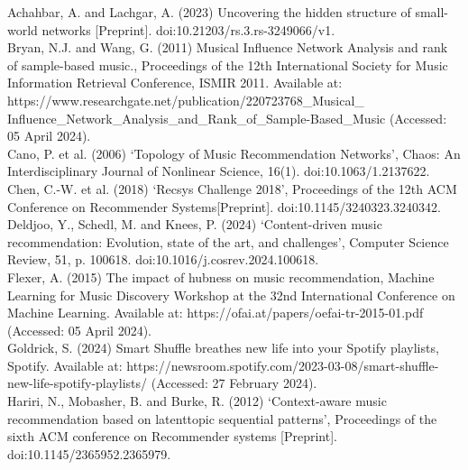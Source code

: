\documentclass[conference]{IEEEtran}
\begin{document}
\begin{thebibliography}{00}

 Achahbar, A. and Lachgar, A. (2023) Uncovering the hidden structure of small-world networks [Preprint]. doi:10.21203/rs.3.rs-3249066/v1. \\

 Bryan, N.J. and Wang, G. (2011) Musical Influence Network Analysis and rank of sample-based music., Proceedings of the 12th International Society for Music Information Retrieval Conference, ISMIR 2011. Available at: https://www.researchgate.net/publication/220723768{\_}Musical{\_}\\Influence{\_}Network{\_}Analysis{\_}and{\_}Rank{\_}of{\_}Sample-Based{\_}Music (Accessed: 05 April 2024). \\

 Cano, P. et al. (2006) ‘Topology of Music Recommendation Networks’, Chaos: An Interdisciplinary Journal of Nonlinear Science, 16(1). doi:10.1063/1.2137622. \\

 Chen, C.-W. et al. (2018) ‘Recsys Challenge 2018’, Proceedings of the 12th ACM Conference on Recommender Systems[Preprint]. doi:10.1145/3240323.3240342. \\

 Deldjoo, Y., Schedl, M. and Knees, P. (2024) ‘Content-driven music recommendation: Evolution, state of the art, and challenges’, Computer Science Review, 51, p. 100618. doi:10.1016/j.cosrev.2024.100618. \\

 Flexer, A. (2015) The impact of hubness on music recommendation, Machine Learning for Music Discovery Workshop at the 32nd International Conference on Machine Learning. Available at: https://ofai.at/papers/oefai-tr-2015-01.pdf (Accessed: 05 April 2024). \\

 Goldrick, S. (2024) Smart Shuffle breathes new life into your Spotify playlists, Spotify. Available at: https://newsroom.spotify.com/2023-03-08/smart-shuffle-new-life-spotify-playlists/ (Accessed: 27 February 2024). \\

 Hariri, N., Mobasher, B. and Burke, R. (2012) ‘Context-aware music recommendation based on latenttopic sequential patterns’, Proceedings of the sixth ACM conference on Recommender systems [Preprint]. doi:10.1145/2365952.2365979. \\


\end{thebibliography}
\end{document}
